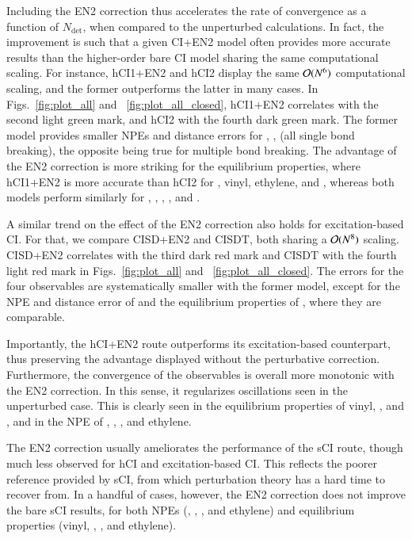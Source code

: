 \documentclass[aip,jcp,reprint,noshowkeys,superscriptaddress]{revtex4-1}
\newcommand{\Ndet}{N_\text{det}}
\begin{document}
 


Including the EN2 correction thus accelerates the rate of convergence as a function of $\Ndet$, when compared to the unperturbed calculations.
In fact, the improvement is such that a given CI+EN2 model often provides more accurate results than the higher-order bare CI model sharing the same computational scaling.
For instance, hCI1+EN2 and hCI2 display the same $\order*{N^6}$ computational scaling, and the former outperforms the latter in many cases.
In Figs.~\ref{fig:plot_all} and ~\ref{fig:plot_all_closed}, hCI1+EN2 correlates with the second light green mark, and hCI2 with the fourth dark green mark.
The former model provides smaller NPEs and distance errors for , ,  (all single bond breaking),
the opposite being true for multiple bond breaking.
The advantage of the EN2 correction is more striking for the equilibrium properties,
where hCI1+EN2 is more accurate than hCI2 for , vinyl, ethylene, and ,
whereas both models perform similarly for , , , , and .

A similar trend on the effect of the EN2 correction also holds for excitation-based CI.
For that, we compare CISD+EN2 and CISDT, both sharing a $\order*{N^8}$ scaling.
CISD+EN2 correlates with the third dark red mark and CISDT with the fourth light red mark in Figs.~\ref{fig:plot_all} and ~\ref{fig:plot_all_closed}.
The errors for the four observables are systematically smaller with the former model,
except for the NPE and distance error of  and the equilibrium properties of , where they are comparable.

Importantly, the hCI+EN2 route outperforms its excitation-based counterpart, thus preserving the advantage displayed without the perturbative correction.
Furthermore, the convergence of the observables is overall more monotonic with the EN2 correction.
In this sense, it regularizes oscillations seen in the unperturbed case.
This is clearly seen in the equilibrium properties of vinyl, , and ,
and in the NPE of , , , and ethylene.

The EN2 correction usually ameliorates the performance of the sCI route, though much less observed for hCI and excitation-based CI.
This reflects the poorer reference provided by sCI, from which perturbation theory has a hard time to recover from.
In a handful of cases, however, the EN2 correction does not improve the bare sCI results,
for both NPEs (, , , and ethylene)
and equilibrium properties (vinyl, , , and ethylene).
\end{document}

